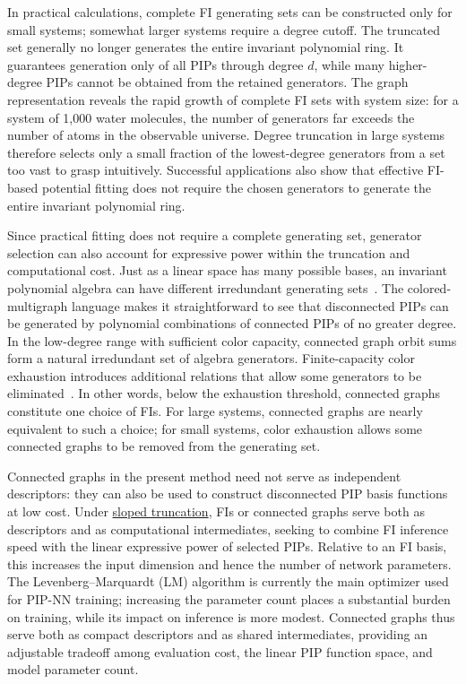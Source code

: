 In practical calculations, complete FI generating sets can be constructed only for small systems; somewhat larger systems require a degree cutoff. The truncated set generally no longer generates the entire invariant polynomial ring. It guarantees generation only of all PIPs through degree \(d\), while many higher-degree PIPs cannot be obtained from the retained generators. The graph representation reveals the rapid growth of complete FI sets with system size: for a system of 1,000 water molecules, the number of generators far exceeds the number of atoms in the observable universe. Degree truncation in large systems therefore selects only a small fraction of the lowest-degree generators from a set too vast to grasp intuitively. Successful applications also show that effective FI-based potential fitting does not require the chosen generators to generate the entire invariant polynomial ring.

Since practical fitting does not require a complete generating set, generator selection can also account for expressive power within the truncation and computational cost. Just as a linear space has many possible bases, an invariant polynomial algebra can have different irredundant generating sets~\cite{Thiery2000GraphInvariants}. The colored-multigraph language makes it straightforward to see that disconnected PIPs can be generated by polynomial combinations of connected PIPs of no greater degree. In the low-degree range with sufficient color capacity, connected graph orbit sums form a natural irredundant set of algebra generators. Finite-capacity color exhaustion introduces additional relations that allow some generators to be eliminated~\cite{Thiery2000GraphInvariants}. In other words, below the exhaustion threshold, connected graphs constitute one choice of FIs. For large systems, connected graphs are nearly equivalent to such a choice; for small systems, color exhaustion allows some connected graphs to be removed from the generating set.

Connected graphs in the present method need not serve as independent descriptors: they can also be used to construct disconnected PIP basis functions at low cost. Under \hyperref[sec:sloped-truncation]{sloped truncation}, FIs or connected graphs serve both as descriptors and as computational intermediates, seeking to combine FI inference speed with the linear expressive power of selected PIPs. Relative to an FI basis, this increases the input dimension and hence the number of network parameters. The Levenberg--Marquardt (LM) algorithm is currently the main optimizer used for PIP-NN training; increasing the parameter count places a substantial burden on training, while its impact on inference is more modest. Connected graphs thus serve both as compact descriptors and as shared intermediates, providing an adjustable tradeoff among evaluation cost, the linear PIP function space, and model parameter count.
